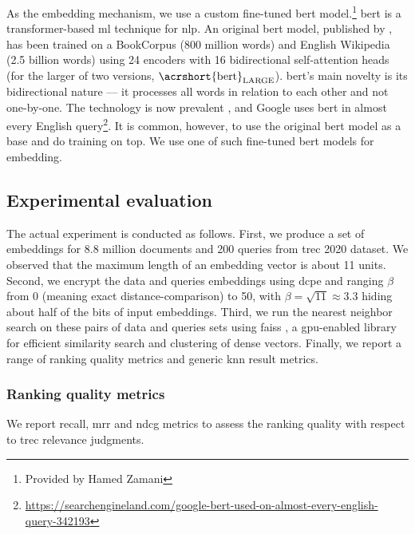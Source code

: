 			As the embedding mechanism, we use a custom fine-tuned \acrshort{bert} model.\footnote{Provided by Hamed Zamani}
			\acrfull{bert} is a transformer-based \acrshort{ml} technique for \acrlong{nlp}.
			An original \acrshort{bert} model, published by \textcite{bert}, has been trained on a BookCorpus \cite{bookcorpus} (800 million words) and English Wikipedia (2.5 billion words) using 24 encoders with 16 bidirectional self-attention heads (for the larger of two versions, $\text{\acrshort{bert}}_\text{LARGE}$).
			\acrshort{bert}'s main novelty is its bidirectional nature --- it processes all words in relation to each other and not one-by-one.
			The technology is now prevalent \cite{bert-is-prevalent}, and Google uses \acrshort{bert} in almost every English query\footnote{
				\url{https://searchengineland.com/google-bert-used-on-almost-every-english-query-342193}
			}.
			It is common, however, to use the original \acrshort{bert} model as a base and do training on top.
			{\color{red}We use one of such fine-tuned \acrshort{bert} models for embedding.}

		\subsection{Experimental evaluation}

			The actual experiment is conducted as follows.
			First, we produce a set of embeddings for 8.8 million documents and 200 queries from \acrshort{trec} 2020 dataset.
			We observed that the maximum length of an embedding vector is about 11 units.
			Second, we encrypt the data and queries embeddings using \acrshort{dcpe} and ranging $\beta$ from 0 (meaning exact distance-comparison) to 50, with $\beta = \sqrt{11} \approx 3.3$ hiding about half of the bits of input embeddings.
			Third, we run the nearest neighbor search on these pairs of data and queries sets using \acrshort{faiss} \cite{faiss}, a \acrshort{gpu}-enabled library for efficient similarity search and clustering of dense vectors.
			Finally, we report a range of ranking quality metrics and generic \acrshort{knn} result metrics.

			\subsubsection{Ranking quality metrics}

				We report recall, \acrfull{mrr} \cite{mrr} and \acrfull{ndcg} \cite{dcg} metrics to assess the ranking quality with respect to \acrshort{trec} relevance judgments.

